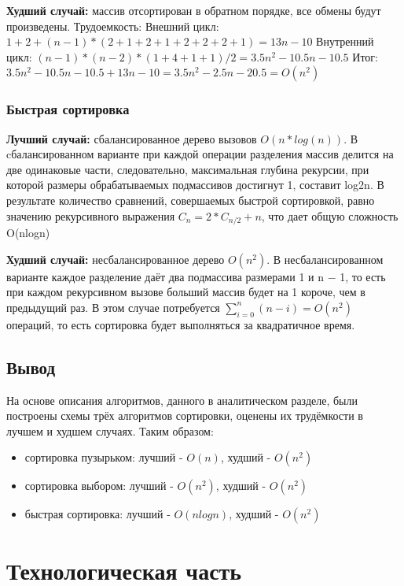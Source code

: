 \documentclass{report}
\begin{document}
\textbf{Худший случай:} массив отсортирован в обратном порядке, все обмены будут произведены. \newline
Трудоемкость: 
\newline
Внешний цикл: $1 + 2 + (n - 1) * (2 + 1 + 2 + 1 + 2 + 2 + 2 + 1) = 13n - 10$
\newline
Внутренний цикл: $(n - 1) * (n - 2) * (1 + 4 + 1 + 1) / 2 = 3.5n^2 -10.5n -10.5$
\newline
Итог: $3.5n^2 -10.5n -10.5 + 13n - 10 = 3.5n^2 -2.5n - 20.5 = O(n^2)$

\subsection{Быстрая сортировка}
\textbf{Лучший случай:} сбалансированное дерево вызовов \(O(n*log(n))\). 
В cбалансированном варианте при каждой операции разделения массив делится на две одинаковые части, следовательно, максимальная глубина рекурсии, при которой размеры обрабатываемых подмассивов достигнут 1, составит log2n. В результате количество сравнений, совершаемых быстрой сортировкой, равно значению рекурсивного выражения $C_n = 2 * C_{n / 2} + n$, что дает общую сложность O(nlogn)

\textbf{Худший случай:} несбалансированное дерево $O(n^2)$.
В несбалансированном варианте каждое разделение даёт два подмассива размерами 1 и n − 1, то есть при каждом рекурсивном вызове больший массив будет на 1 короче, чем в предыдущий раз. В этом случае потребуется $\sum_{{i=0}}^{n}(n-i)=O(n^{2})$ операций, то есть сортировка будет выполняться за квадратичное время.


\section{Вывод}

На основе описания алгоритмов, данного в аналитическом разделе, были построены схемы трёх алгоритмов сортировки, оценены их трудёмкости в лучшем и худшем случаях. Таким образом:
\begin{itemize}
\item сортировка пузырьком: лучший - $O(n)$, худший - $O(n^2)$ 
\item сортировка выбором: лучший - $O(n^2)$, худший - $O(n^2)$ 
\item быстрая сортировка: лучший - $O(nlogn)$, худший - $O(n^2)$ 
\end{itemize}
\chapter{Технологическая часть}
\end{document}
